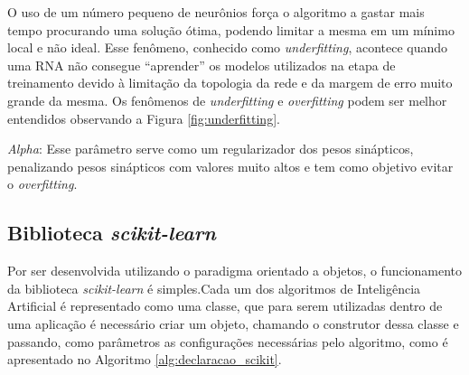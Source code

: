 \documentclass[12pt,oneside,a4paper,chapter=TITLE,section=TITLE,sumario
		=tradicional]{abntex2}
\begin{document}
\begin{lista}
			O uso de um número pequeno de neurônios força o algoritmo a gastar mais tempo procurando uma solução ótima, podendo limitar a mesma em um mínimo local e não ideal. Esse fenômeno, conhecido como \textit{underfitting}, acontece quando uma RNA não consegue ``aprender'' os modelos utilizados na etapa de treinamento devido à limitação da topologia da rede e da margem de erro muito grande da mesma. Os fenômenos de \textit{underfitting} e \textit{overfitting} podem ser melhor entendidos observando a Figura \ref{fig:underfitting}. 
						
			\begin{figure}[H]
				\hspace{0.3cm}	    
				\hspace{0.3cm}
			\end{figure}
		
			\item \textit{Alpha}: Esse parâmetro serve como um regularizador dos pesos sinápticos, penalizando pesos sinápticos com valores muito altos e tem como objetivo evitar o \textit{overfitting}.
		
		\end{lista}
		
		\subsection{Biblioteca \textit{scikit-learn}}
		
		Por ser desenvolvida utilizando o paradigma orientado a objetos, o funcionamento da biblioteca \textit{scikit-learn} é simples.\hspace{0.1cm}Cada um dos algoritmos de Inteligência Artificial é representado como uma classe, que para serem utilizadas dentro de uma aplicação é necessário criar um objeto, chamando o construtor dessa classe e passando, como parâmetros as configurações necessárias pelo algoritmo, como é apresentado no Algoritmo \ref{alg:declaracao_scikit}.
		
\end{document}
